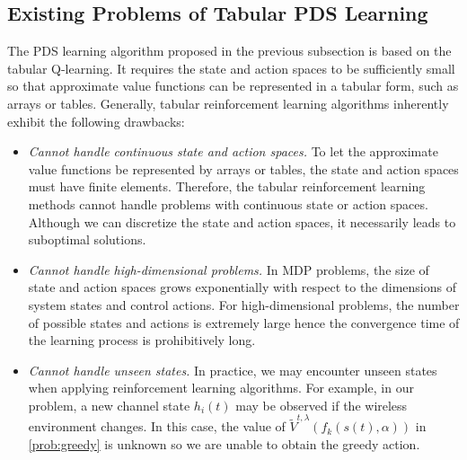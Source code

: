 \documentclass[lettersize, journal]{IEEEtran}
\begin{document}
\subsection{Existing Problems of Tabular PDS Learning}
The PDS learning algorithm proposed in the previous subsection is based on the tabular Q-learning.
It requires the state and action spaces to be sufficiently small so that approximate value functions can be represented 
in a tabular form, such as arrays or tables.
Generally, tabular reinforcement learning algorithms inherently exhibit the following drawbacks:
\begin{itemize}
    \item \emph{Cannot handle continuous state and action spaces.}
        To let the approximate value functions be represented by arrays or tables, the state and action spaces must have finite elements.
        Therefore, the tabular reinforcement learning methods cannot handle problems with continuous state or action spaces.
        Although we can discretize the state and action spaces, it necessarily leads to suboptimal solutions.
    \item \emph{Cannot handle high-dimensional problems.}
        In MDP problems,
        the size of state and action spaces grows exponentially with respect to the dimensions of system states and control actions.
        For high-dimensional problems, the number of possible states and actions is extremely large hence the convergence time of the learning process
        is prohibitively long.
    \item \emph{Cannot handle unseen states.}
        In practice, we may encounter unseen states when applying reinforcement learning algorithms.
        For example, in our problem, a new channel state $h_i(t)$ may be observed if the wireless environment changes.
        In this case, the value of $\tilde{V}^{t, \lambda}( f_k(s(t), \alpha) )$ in \eqref{prob:greedy} is unknown
        so we are unable to obtain the greedy action.
\end{itemize}


\end{document}
